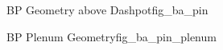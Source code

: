 \begin{geoitem}{\acs{BP} Geometry above Dashpot}{fig_ba_pin}\centering

\end{geoitem}
\begin{geoitem}{\acs{BP} Plenum Geometry}{fig_ba_pin_plenum}\centering

\end{geoitem}
